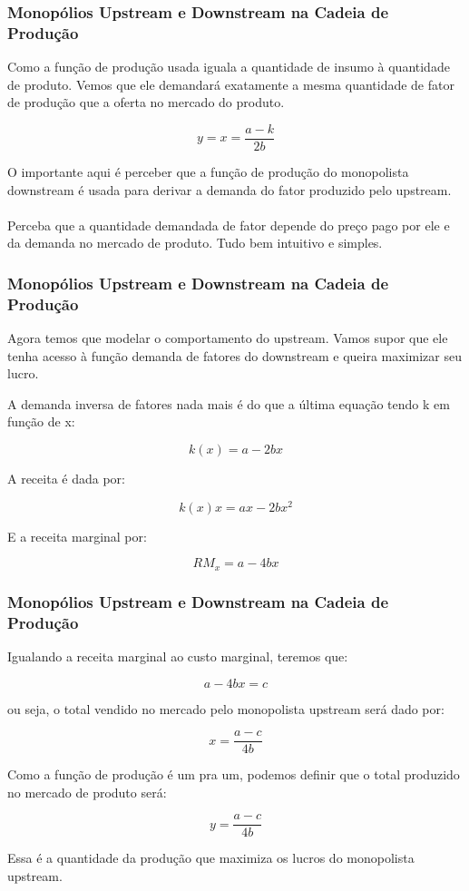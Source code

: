 \documentclass{beamer}[10]
\begin{document}
\begin{frame}
	\frametitle{Monopólios Upstream e Downstream na Cadeia de Produção}

	Como a função de produção usada iguala a quantidade de insumo à quantidade de produto. Vemos que ele demandará exatamente a mesma quantidade de fator de produção que a oferta no mercado do produto.

	$$ y = x = \frac{a - k}{2b} $$

	O importante aqui é perceber que a função de produção do monopolista downstream é usada para derivar a demanda do fator produzido pelo upstream. 
	\\~\\
	Perceba que a quantidade demandada de fator depende do preço pago por ele e da demanda no mercado de produto. Tudo bem intuitivo e simples.

\end{frame}

\begin{frame}
	\frametitle{Monopólios Upstream e Downstream na Cadeia de Produção}

	Agora temos que modelar o comportamento do upstream. Vamos supor que ele tenha acesso à função demanda de fatores do downstream e queira maximizar seu lucro.

	A demanda inversa de fatores nada mais é do que a última equação tendo k em função de x:

	$$ k(x) = a - 2bx $$

	A receita é dada por:

	$$ k(x)x = ax - 2bx^2 $$

	E a receita marginal por:

	$$ RM_x = a - 4bx $$

\end{frame}

\begin{frame}
	\frametitle{Monopólios Upstream e Downstream na Cadeia de Produção}

	Igualando a receita marginal ao custo marginal, teremos que:

	$$ a - 4bx = c $$

	ou seja, o total vendido no mercado pelo monopolista upstream será dado por:

	$$ x = \frac{a - c}{4b} $$

	Como a função de produção é um pra um, podemos definir que o total produzido no mercado de produto será:

	$$ y = \frac{a - c}{4b} $$

	Essa é a quantidade da produção que maximiza os lucros do monopolista upstream.

\end{frame}
\end{document}
